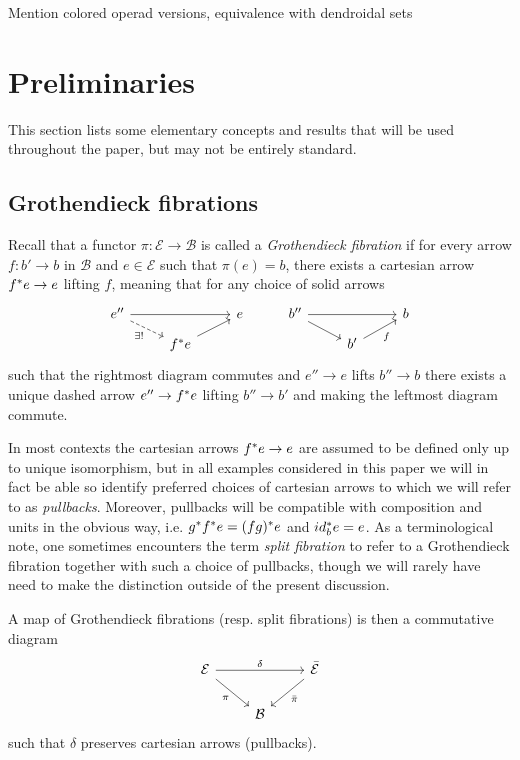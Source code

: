 \documentclass[a4paper,10pt]{article}%
\begin{document}
{\color{red} Mention colored operad versions, equivalence with dendroidal sets}



\section{Preliminaries}
\label{PRELIM_SECTION}

This section lists some elementary concepts
and results that will be used throughout the paper,
but may not be entirely standard.

\subsection{Grothendieck fibrations}
Recall that a functor 
$\pi \colon \mathcal{E} \to \mathcal{B}$
is called a \textit{Grothendieck fibration}
if for every arrow 
$f \colon b' \to b$ in $\mathcal{B}$
and $e \in \mathcal{E}$ such that $\pi(e)=b$,
there exists a cartesian arrow 
$f^{\**} e \to e$ lifting $f$, meaning that for any choice of solid arrows 
\[
\begin{tikzcd}[row sep=7pt]
	e'' \ar{rr} \ar[dashed]{rd}[swap]{\exists !} & & 
	e
&
	b'' \ar{rr} \ar{rd} & & 
	b
\\
	& f^{\**} e \ar{ru} &
&
	& b' \ar{ru}[swap]{f} &
\end{tikzcd}
\]
such that the rightmost diagram commutes and 
$e'' \to e$ lifts $b'' \to b$
there exists a unique dashed arrow
$e'' \to f^{\**} e$ lifting $b'' \to b'$ and making the leftmost diagram commute.

In most contexts the cartesian arrows $f^{\**} e \to e$ are assumed to be defined only up to unique isomorphism, 
but in all examples considered in this paper
we will in fact be able so identify preferred choices of cartesian arrows to which we will refer to as \textit{pullbacks}.
Moreover, pullbacks will be compatible with composition and units in the obvious way, i.e. $g^{\**} f^{\**} e = (fg)^{\**}e$ and $id_b^{\**}e=e$.
As a terminological note, one sometimes encounters the term \textit{split fibration} to refer to a Grothendieck fibration together with such a choice of pullbacks, though we will rarely have need to make the distinction outside of the present discussion. 

A map of Grothendieck fibrations (resp. split fibrations) is then a commutative diagram
\begin{equation}
\begin{tikzcd}\label{GROTHFIBMAP EQ}
	\mathcal{E} \ar{rr}{\delta} \ar{rd}[swap]{\pi} &&
	\bar{\mathcal{E}} \ar{dl}{\bar{\pi}}
\\
	& \mathcal{B}
\end{tikzcd}
\end{equation}
such that $\delta$ preserves cartesian arrows (pullbacks).
\end{document}
